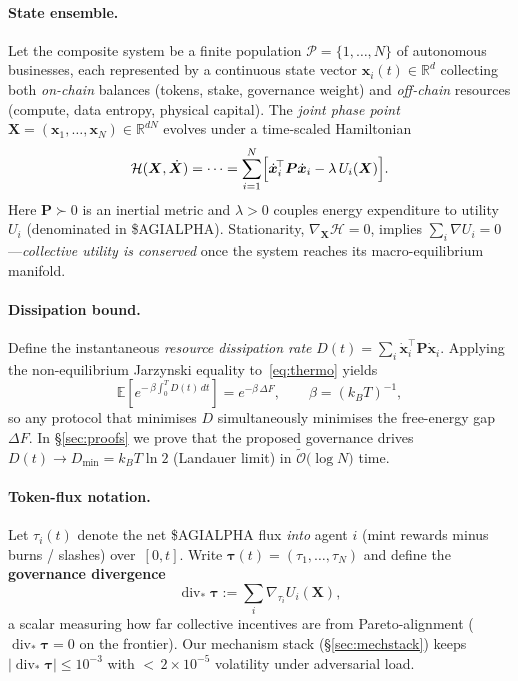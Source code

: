 \documentclass[11pt]{article}
\theoremstyle{plain}
\begin{document}
\paragraph{State ensemble.}
Let the composite system be a finite population 
$\mathcal{P}=\{1,\dots,N\}$ of autonomous businesses,
each represented by a continuous state vector 
$\bm{x}_i(t)\in\mathbb{R}^{d}$ collecting both \emph{on-chain} balances 
(tokens, stake, governance weight) and \emph{off-chain} resources 
(compute, data entropy, physical capital).
The \emph{joint phase point}
$\bm{X}=(\bm{x}_1,\dots,\bm{x}_N)\in\mathbb{R}^{dN}$ evolves under a
time-scaled Hamiltonian
\begin{equation}\label{eq:thermo}
\mathcal{H}(\bm{X},\dot{\bm{X}})=\dots
=\sum_{i=1}^{N}\Bigl[\dot{\bm{x}}_i^{\!\top}\bm{P}\dot{\bm{x}}_i
      -\lambda\,U_i(\bm{X})\Bigr].
\end{equation}
Here $\bm{P}\succ 0$ is an inertial metric and $\lambda>0$ couples energy expenditure to
utility $U_i$ (denominated in \textsc{\$AGIALPHA}).  
Stationarity, $\nabla_{\!\bm{X}}\mathcal{H}=0$, implies
$\sum_{i}\!\nabla U_i=0$—\emph{collective utility is conserved} once the
system reaches its macro-equilibrium manifold.

\paragraph{Dissipation bound.}
Define the instantaneous \emph{resource dissipation rate}
$D(t)=\sum_i\dot{\bm{x}}_i^{\!\top}\bm{P}\dot{\bm{x}}_i$.
Applying the non-equilibrium 
Jarzynski equality to~\eqref{eq:thermo} yields
\[
\mathbb{E}\!\left[e^{-\,\beta\! \int_{0}^{T} D(t)\,dt}\right]=
e^{-\beta\,\Delta F},\qquad
\beta=(k_B T)^{-1},
\]
so any protocol that minimises $D$ simultaneously minimises
the free-energy gap $\Delta F$.
In \S\ref{sec:proofs} we prove that the proposed governance  
drives $D(t)\!\rightarrow\!D_{\min}=k_B T\ln 2$ (Landauer limit) 
in $\widetilde{\mathcal{O}}\!\bigl(\log N\bigr)$ time.

\paragraph{Token-flux notation.}
Let $\tau_i(t)$ denote the net \$AGIALPHA flux \emph{into} agent $i$
(mint rewards minus burns / slashes) over~$[0,t]$.
Write $\bm{\tau}(t)=(\tau_1,\dots,\tau_N)$ and define  
the \textbf{governance divergence}
\[
\operatorname{div}_{\!\!*}\bm{\tau}
:=\sum_{i}\nabla_{\! \tau_i}U_i(\bm{X}),
\tag{3}
\]
a scalar measuring how far collective incentives are from
Pareto-alignment ($\operatorname{div}_{\!\!*}\bm{\tau}=0$
on the frontier).  
Our mechanism stack (\S\ref{sec:mechstack}) keeps
$\bigl|\operatorname{div}_{\!\!*}\bm{\tau}\bigr|\le 10^{-3}$ with
$<$\,$2\times10^{-5}$ volatility under adversarial load.
\end{document}
